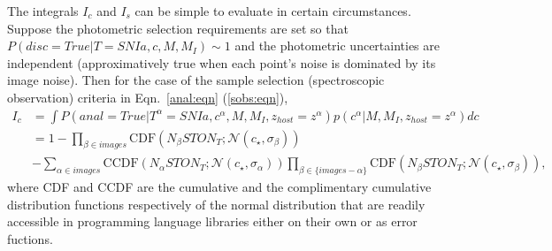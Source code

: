 \documentclass[preprint,3p]{elsarticle}
\begin{document}
The integrals $I_c$ and $I_s$ can be simple to evaluate in certain circumstances.  Suppose the photometric selection requirements
are set so that $P(disc=True | T=SNIa,c,  M, M_I) \sim 1$ and the photometric uncertainties are independent (approximatively true when
each point's noise is dominated by its image noise).  Then for the case of the sample selection (spectroscopic observation)
criteria in Eqn.~\ref{anal:eqn} (\ref{sobs:eqn}), 
\begin{align}
I_c & = \int  P(anal=True|T^\alpha=SNIa,c^\alpha, M, M_I,z_{host}=z^\alpha) p(c^\alpha|M, M_I,z_{host}=z^\alpha) dc\\
& = 1 - \prod_{\beta \in images} \text{CDF}\left(N_\beta STON_T; \mathcal{N}(c_\star,\sigma_\beta)\right)   \nonumber \\
& - \sum_{\alpha \in images}  \text{CCDF}\left(N_\alpha STON_T;\mathcal{N}(c_\star,\sigma_\alpha)\right)   \prod_{\beta \in \{images-\alpha\}} \text{CDF}\left(N_\beta STON_T;\mathcal{N}(c_\star,\sigma_\beta)\right),
\end{align}
where CDF and CCDF are the cumulative and the complimentary cumulative distribution functions respectively of the normal distribution
that are readily accessible in programming language libraries either on their own or as error fuctions.
%
%
%
%
\end{document}
